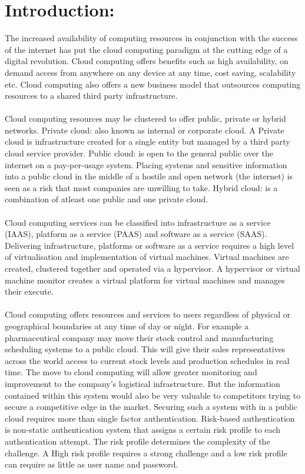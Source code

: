 \documentclass[11pt]{article}
\begin{document}
\section{Introduction:}
The increased availability of computing resources in conjunction with the success of the internet has put the cloud computing paradigm at the cutting edge of a digital revolution. Cloud computing offers benefits such as high availability, on demand access from anywhere on any device at any time, cost saving, scalability etc. \cite{Zhang2010} Cloud computing also offers a new business model that outsources computing resources to a shared third party infrastructure. 
\\ \\
Cloud computing resources may be clustered to offer public, private or hybrid networks. Private cloud: also known as internal or corporate cloud. A Private cloud is infrastructure created for a single entity but managed by a third party cloud service provider. Public cloud: is open to the general public over the internet on a pay-per-usage system. Placing systems and sensitive information into a public cloud in the middle of a hostile and open network (the internet) is seen as a risk that most companies are unwilling to take. Hybrid cloud: is a combination of atleast one public and one private cloud.\cite{Onwubiko2010}
\\ \\
Cloud computing services can be classified into infrastructure as a service (IAAS), platform as a service (PAAS) and software as a service (SAAS). Delivering infrastructure, platforms or software as a service requires a high level of virtualisation and implementation of virtual machines. Virtual machines are created, clustered together and operated via a hypervisor. A hypervisor or virtual machine monitor creates a virtual platform for virtual machines and manages their execute.
\\ \\
Cloud computing offers resources and services to users regardless of physical or geographical boundaries at any time of day or night. For example a pharmaceutical company may move their stock control and manufacturing scheduling systems to a public cloud. This will give their sales representatives across the world access to current stock levels and production schedules in real time. The move to cloud computing will allow greater monitoring and improvement to the company's logistical infrastructure. But the information contained within this system would also be very valuable to competitors trying to secure a competitive edge in the market. Securing such a system with in a public cloud requires more than single factor authentication. Risk-based authentication is non-static authentication system that assigns a certain risk profile to each authentication attempt. The risk profile determines the complexity of the challenge. A High risk profile requires a strong challenge and a low risk profile can require as little as user name and password.
\end{document}
